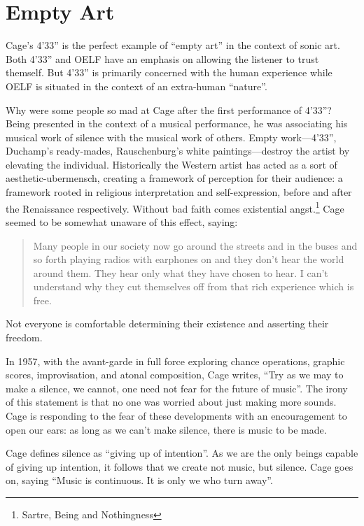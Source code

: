 \documentclass{thesis}
\begin{document}
\section{Empty Art}
	Cage's 4'33'' is the perfect example of ``empty art'' in the context of sonic art.\cite{larry_j_solomon_sounds_1998} Both 4'33'' and OELF have an emphasis on allowing the listener to trust themself. But 4'33'' is primarily concerned with the human experience while OELF is situated in the context of an extra-human ``nature''.
	
	Why were some people so mad at Cage after the first performance of 4'33''? Being presented in the context of a musical performance, he was associating his musical work of silence with the musical work of others. Empty work---4'33'', Duchamp's ready-mades, Rauschenburg's white paintings---destroy the artist by elevating the individual. Historically the Western artist has acted as a sort of aesthetic-ubermensch, creating a framework of perception for their audience: a framework rooted in religious interpretation and self-expression, before and after the Renaissance respectively. Without bad faith comes existential angst.\footnote{Sartre, Being and Nothingness} Cage seemed to be somewhat unaware of this effect, saying:
	
\begin{quote}
	Many people in our society now go around the streets and in the buses and so forth playing radios with earphones on and they don't hear the world around them. They hear only what they have chosen to hear. I can't understand why they cut themselves off from that rich experience which is free.
\end{quote}

	Not everyone is comfortable determining their existence and asserting their freedom.
	
	In 1957, with the avant-garde in full force exploring chance operations, graphic scores, improvisation, and atonal composition, Cage writes, ``Try as we may to make a silence, we cannot, one need not fear for the future of music''. The irony of this statement is that no one was worried about just making more sounds. Cage is responding to the fear of these developments with an encouragement to open our ears: as long as we can't make silence, there is music to be made.
	
	Cage defines silence as ``giving up of intention''. As we are the only beings capable of giving up intention, it follows that we create not music, but silence. Cage goes on, saying ``Music is continuous. It is only we who turn away''.
			
\end{document}
